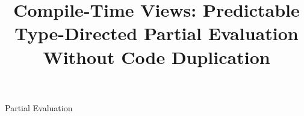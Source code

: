 \documentclass[10pt]{sigplanconf}
\begin{document}
\title{Compile-Time Views: Predictable Type-Directed Partial Evaluation Without Code Duplication}

\maketitle

\begin{abstract}

\end{abstract}

\keywords
Partial Evaluation













\end{document}
